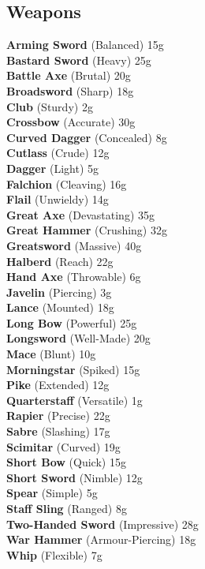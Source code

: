 \documentclass[10pt,twoside]{article}
\begin{document}
\newpage

\subsection{Weapons}

\begin{multicols}{3}
\small
\textbf{Arming Sword} (Balanced) \dotfill 15g \\
\textbf{Bastard Sword} (Heavy) \dotfill 25g \\
\textbf{Battle Axe} (Brutal) \dotfill 20g \\
\textbf{Broadsword} (Sharp) \dotfill 18g \\
\textbf{Club} (Sturdy) \dotfill 2g \\
\textbf{Crossbow} (Accurate) \dotfill 30g \\
\textbf{Curved Dagger} (Concealed) \dotfill 8g \\
\textbf{Cutlass} (Crude) \dotfill 12g \\
\textbf{Dagger} (Light) \dotfill 5g \\
\textbf{Falchion} (Cleaving) \dotfill 16g \\
\textbf{Flail} (Unwieldy) \dotfill 14g \\
\textbf{Great Axe} (Devastating) \dotfill 35g \\
\textbf{Great Hammer} (Crushing) \dotfill 32g \\
\textbf{Greatsword} (Massive) \dotfill 40g \\
\textbf{Halberd} (Reach) \dotfill 22g \\
\textbf{Hand Axe} (Throwable) \dotfill 6g \\
\textbf{Javelin} (Piercing) \dotfill 3g \\
\textbf{Lance} (Mounted) \dotfill 18g \\
\textbf{Long Bow} (Powerful) \dotfill 25g \\
\textbf{Longsword} (Well-Made) \dotfill 20g \\
\textbf{Mace} (Blunt) \dotfill 10g \\
\textbf{Morningstar} (Spiked) \dotfill 15g \\
\textbf{Pike} (Extended) \dotfill 12g \\
\textbf{Quarterstaff} (Versatile) \dotfill 1g \\
\textbf{Rapier} (Precise) \dotfill 22g \\
\textbf{Sabre} (Slashing) \dotfill 17g \\
\textbf{Scimitar} (Curved) \dotfill 19g \\
\textbf{Short Bow} (Quick) \dotfill 15g \\
\textbf{Short Sword} (Nimble) \dotfill 12g \\
\textbf{Spear} (Simple) \dotfill 5g \\
\textbf{Staff Sling} (Ranged) \dotfill 8g \\
\textbf{Two-Handed Sword} (Impressive) \dotfill 28g \\
\textbf{War Hammer} (Armour-Piercing) \dotfill 18g \\
\textbf{Whip} (Flexible) \dotfill 7g \\
\end{multicols}
\end{document}
